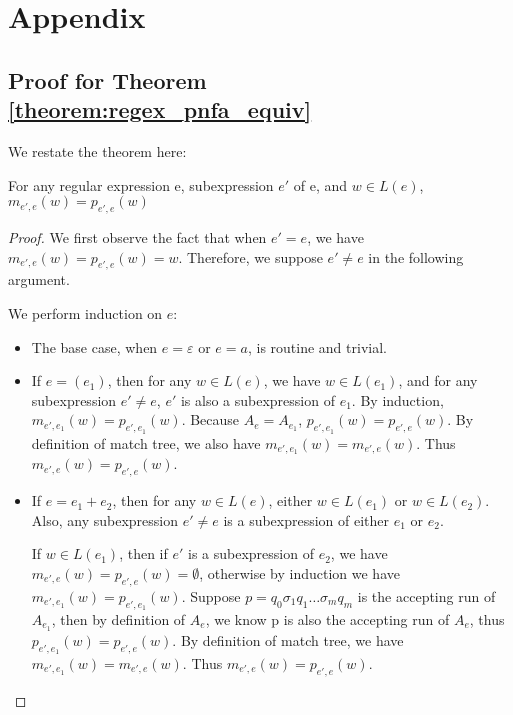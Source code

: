 \section{Appendix}

\subsection{Proof for Theorem \ref{theorem:regex_pnfa_equiv}}

\label{proof:regex_pnfa_equiv}

We restate the theorem here:
\begin{theorem}
  For any regular expression e, subexpression $e'$ of e, and $w \in L (e)$,
  $m_{e', e} (w) = p_{e', e} (w)$
\end{theorem}

\begin{proof}
  We first observe the fact that when $e' = e$, we have $m_{e', e} (w) =
  p_{e', e} (w) = w$. Therefore, we suppose $e' \neq e$ in the following
  argument.
  
  We perform induction on $e$:
  \begin{itemize}
    \item The base case, when $e = \varepsilon$ or $e = a$, is routine and
    trivial.
    
    \item If $e = (e_1)$, then for any $w \in L (e)$, we have $w \in L (e_1)$,
    and for any subexpression $e' \neq e$, $e'$ is also a subexpression of
    $e_1$. By induction, \ $m_{e', e_1} (w) = p_{e', e_1} (w)$. Because $A_e =
    A_{e_1}$, $p_{e', e_1} (w) = p_{e', e} (w)$. By definition of match tree,
    we also have $m_{e', e_1} (w) = m_{e', e} (w)$. Thus $m_{e', e} (w) =
    p_{e', e} (w)$.
    
    \item If $e = e_1 + e_2$, then for any $w \in L (e)$, either $w \in L
    (e_1)$ or $w \in L (e_2)$. Also, any subexpression $e' \neq e$ is a
    subexpression of either $e_1$ or $e_2$.
    
    If $w \in L (e_1)$, then if $e'$ is a subexpression of $e_2$, we have
    $m_{e', e} (w) = p_{e', e} (w) = \emptyset$, otherwise by induction we
    have $m_{e', e_1} (w) = p_{e', e_1} (w)$. Suppose $p = q_0 \sigma_1 q_1
    \ldots \sigma_m q_m$ is the accepting run of $A_{e_1}$, then by definition
    of $A_e$, we know p is also the accepting run of $A_e$, thus $p_{e', e_1}
    (w) = p_{e', e} (w)$. By definition of match tree, we have $m_{e', e_1}
    (w) = m_{e', e} (w)$. Thus $m_{e', e} (w) = p_{e', e} (w)$.
    

\end{itemize}
\end{proof}
